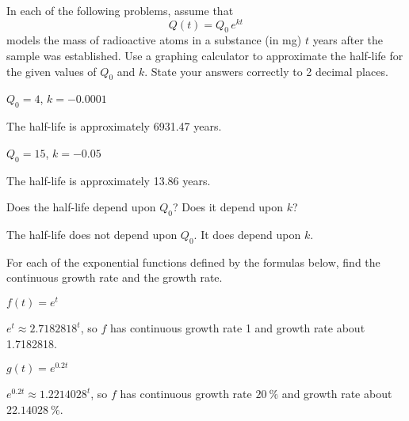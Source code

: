 \begin{exercises}
\begin{problem}
In each of the following problems, assume that 
\[
	Q(t) = Q_0\,e^{kt}
\]
models the mass of radioactive atoms in a substance (in \si{\milli\gram}) $t$ years after the sample was established. Use a graphing calculator to approximate the half-life for the given values of $Q_0$ and $k$. State 
your answers correctly to 2 decimal places.
\begin{multicols}{2}
	\begin{subproblem}
		$Q_0=4$, $k=-0.0001$
		\begin{shortsolution}
			The half-life is approximately 6931.47 years.
		\end{shortsolution}
	\end{subproblem}
	\begin{subproblem}\label{exp:prob:q0k}
		$Q_0=15$, $k=-0.05$
		\begin{shortsolution}
			The half-life is approximately 13.86 years.
		\end{shortsolution}
	\end{subproblem}
\end{multicols}
\begin{subproblem}
	Does the half-life depend upon $Q_0$? Does it depend upon $k$?
	\begin{shortsolution}
		The half-life does not depend upon $Q_0$. It does depend upon $k$.
	\end{shortsolution}
\end{subproblem}
\end{problem}
\begin{problem}
For each of the exponential functions defined by the formulas below, find the continuous growth rate and the growth rate.
\begin{multicols}{3}
	\begin{subproblem}
		$f(t) = e^t$
		\begin{shortsolution}
			$e^t\approx 2.7182818^t$, so $f$ has continuous growth rate 1 and growth rate about 1.7182818.
		\end{shortsolution}
	\end{subproblem}
	\begin{subproblem}
		$g(t)  = e^{0.2t}$
		\begin{shortsolution}
			$e^{0.2t}\approx 1.2214028^t$,  so $f$ has continuous growth rate $\SI{20}{\percent}$ and growth rate about $\SI{22.14028}{\percent}$.

\end{shortsolution}
\end{subproblem}
\end{multicols}
\end{problem}
\end{exercises}
